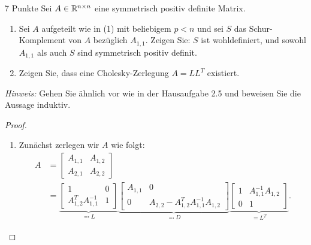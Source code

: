 \documentclass{problemset}
\begin{document}
\begin{problem}{7 Punkte}
Sei \( A \in \mathbb{R}^{n \times n} \) eine symmetrisch positiv definite Matrix.
\begin{enumerate}
    \item Sei \( A \) aufgeteilt wie in (1) mit beliebigem \( p < n \) und sei
          \( S \) das Schur-Komplement von \( A \) bezüglich \( A_{1,1} \).
          Zeigen Sie: \( S \) ist wohldefiniert, und sowohl \( A_{1,1} \) als
          auch \( S \) sind symmetrisch positiv definit.

    \item Zeigen Sie, dass eine Cholesky-Zerlegung \( A = LL^T \) existiert.
\end{enumerate}
\textit{Hinweis:} Gehen Sie ähnlich vor wie in der Hausaufgabe 2.5 und beweisen Sie die Aussage induktiv.

\begin{proof}\leavevmode
    \begin{enumerate}
        \item \label{problem:6:a} Zunächst zerlegen wir \( A \) wie folgt:
              \begin{align*}
                  A & =
                  \begin{bmatrix}
                      A_{1,1} & A_{1,2} \\ A_{2,1} & A_{2,2}
                  \end{bmatrix} \\
                    & =
                  \underbrace{
                      \begin{bmatrix}
                          1                      & 0 \\
                          A_{1,2}^T A_{1,1}^{-1} & 1
                      \end{bmatrix}
                  }_{\eqcolon L}
                  \underbrace{
                      \begin{bmatrix}
                          A_{1,1} & 0                                        \\
                          0       & A_{2,2} - A_{1,2}^T A_{1,1}^{-1} A_{1,2}
                      \end{bmatrix}
                  }_{\eqcolon D}
                  \underbrace{
                      \begin{bmatrix}
                          1 & A_{1,1}^{-1} A_{1,2} \\
                          0 & 1
                      \end{bmatrix}}_{= L^T}.
              \end{align*}


\end{enumerate}
\end{proof}
\end{problem}
\end{document}
